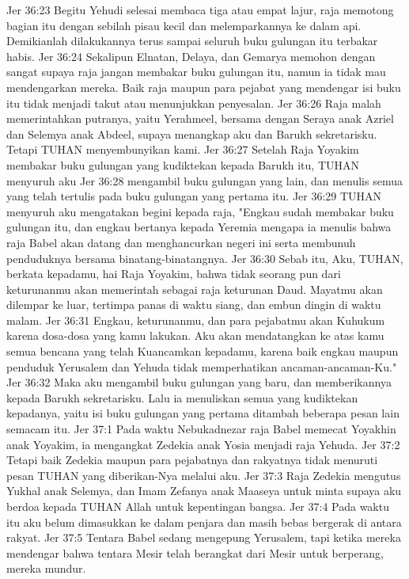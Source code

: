 Jer 36:23  Begitu Yehudi selesai membaca tiga atau empat lajur, raja memotong bagian itu dengan sebilah pisau kecil dan melemparkannya ke dalam api. Demikianlah dilakukannya terus sampai seluruh buku gulungan itu terbakar habis.
Jer 36:24  Sekalipun Elnatan, Delaya, dan Gemarya memohon dengan sangat supaya raja jangan membakar buku gulungan itu, namun ia tidak mau mendengarkan mereka. Baik raja maupun para pejabat yang mendengar isi buku itu tidak menjadi takut atau menunjukkan penyesalan.
Jer 36:26  Raja malah memerintahkan putranya, yaitu Yerahmeel, bersama dengan Seraya anak Azriel dan Selemya anak Abdeel, supaya menangkap aku dan Barukh sekretarisku. Tetapi TUHAN menyembunyikan kami.
Jer 36:27  Setelah Raja Yoyakim membakar buku gulungan yang kudiktekan kepada Barukh itu, TUHAN menyuruh aku
Jer 36:28  mengambil buku gulungan yang lain, dan menulis semua yang telah tertulis pada buku gulungan yang pertama itu.
Jer 36:29  TUHAN menyuruh aku mengatakan begini kepada raja, "Engkau sudah membakar buku gulungan itu, dan engkau bertanya kepada Yeremia mengapa ia menulis bahwa raja Babel akan datang dan menghancurkan negeri ini serta membunuh penduduknya bersama binatang-binatangnya.
Jer 36:30  Sebab itu, Aku, TUHAN, berkata kepadamu, hai Raja Yoyakim, bahwa tidak seorang pun dari keturunanmu akan memerintah sebagai raja keturunan Daud. Mayatmu akan dilempar ke luar, tertimpa panas di waktu siang, dan embun dingin di waktu malam.
Jer 36:31  Engkau, keturunanmu, dan para pejabatmu akan Kuhukum karena dosa-dosa yang kamu lakukan. Aku akan mendatangkan ke atas kamu semua bencana yang telah Kuancamkan kepadamu, karena baik engkau maupun penduduk Yerusalem dan Yehuda tidak memperhatikan ancaman-ancaman-Ku."
Jer 36:32  Maka aku mengambil buku gulungan yang baru, dan memberikannya kepada Barukh sekretarisku. Lalu ia menuliskan semua yang kudiktekan kepadanya, yaitu isi buku gulungan yang pertama ditambah beberapa pesan lain semacam itu.
Jer 37:1  Pada waktu Nebukadnezar raja Babel memecat Yoyakhin anak Yoyakim, ia mengangkat Zedekia anak Yosia menjadi raja Yehuda.
Jer 37:2  Tetapi baik Zedekia maupun para pejabatnya dan rakyatnya tidak menuruti pesan TUHAN yang diberikan-Nya melalui aku.
Jer 37:3  Raja Zedekia mengutus Yukhal anak Selemya, dan Imam Zefanya anak Maaseya untuk minta supaya aku berdoa kepada TUHAN Allah untuk kepentingan bangsa.
Jer 37:4  Pada waktu itu aku belum dimasukkan ke dalam penjara dan masih bebas bergerak di antara rakyat.
Jer 37:5  Tentara Babel sedang mengepung Yerusalem, tapi ketika mereka mendengar bahwa tentara Mesir telah berangkat dari Mesir untuk berperang, mereka mundur.
